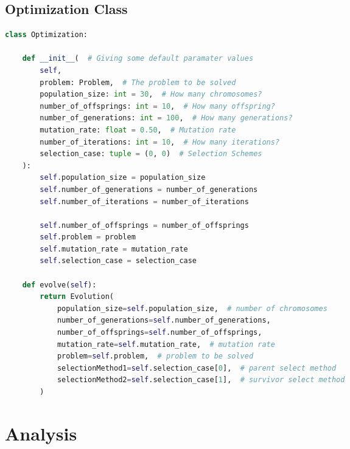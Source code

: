 \documentclass[12pt]{report} %
\begin{document}
\newpage

\section{Optimization Class}

\begin{changemargin}{-3cm}{-2cm}

	\begin{lstlisting}[language=python, caption= {Optimization class}, captionpos=b]
class Optimization:

    def __init__(  # Giving some default paramater values
        self,
        problem: Problem,  # The problem to be solved
        population_size: int = 30,  # How many chromosomes?
        number_of_offsprings: int = 10,  # How many offspring?
        number_of_generations: int = 100,  # How many generations?
        mutation_rate: float = 0.50,  # Mutation rate
        number_of_iterations: int = 10,  # How many iterations?
        selection_case: tuple = (0, 0)  # Selection Schemes
    ):
        self.population_size = population_size
        self.number_of_generations = number_of_generations
        self.number_of_iterations = number_of_iterations

        self.number_of_offsprings = number_of_offsprings
        self.problem = problem
        self.mutation_rate = mutation_rate
        self.selection_case = selection_case

    def evolve(self):
        return Evolution(
            population_size=self.population_size,  # number of chromosomes
            number_of_generations=self.number_of_generations,
            number_of_offsprings=self.number_of_offsprings,
            mutation_rate=self.mutation_rate,  # mutation rate
            problem=self.problem,  # problem to be solved
            selectionMethod1=self.selection_case[0],  # parent select method
            selectionMethod2=self.selection_case[1],  # survivor select method
        )
\end{lstlisting}
\end{changemargin}

\newpage

\chapter{Analysis}
\end{document}
